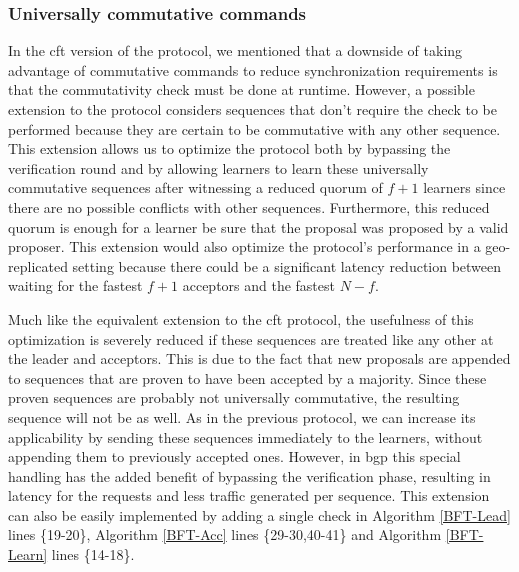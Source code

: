 \subsubsection{Universally commutative commands}
In the \acrshort{cft} version of the protocol, we mentioned that a downside of taking advantage of commutative commands to reduce synchronization requirements is that the commutativity check must be done at runtime. However, a possible extension to the protocol considers sequences that don't require the check to be performed because they are certain to be commutative with any other sequence. This extension allows us to optimize the protocol both by bypassing the verification round and by allowing learners to learn these universally commutative sequences after witnessing a reduced quorum of $f+1$ learners since there are no possible conflicts with other sequences. Furthermore, this reduced quorum is enough for a learner be sure that the proposal was proposed by a valid proposer. This extension would also optimize the protocol's performance in a geo-replicated setting because there could be a significant latency reduction between waiting for the fastest $f+1$ acceptors and the fastest $N-f$.\par
{\color{red} Much like the equivalent extension to the \acrshort{cft} protocol, the usefulness of this optimization is severely reduced if these sequences are treated like any other at the leader and acceptors. This is due to the fact that new proposals are appended to sequences that are proven to have been accepted by a majority. Since these proven sequences are probably not universally commutative, the resulting sequence will not be as well. As in the previous protocol, we can increase its applicability by sending these sequences immediately to the learners, without appending them to previously accepted ones. However, in \acrshort{bgp} this special handling has the added benefit of bypassing the verification phase, resulting in latency for the requests and less traffic generated per sequence. This extension can also be easily implemented by adding a single check in Algorithm \ref{BFT-Lead} lines \{19-20\}, Algorithm \ref{BFT-Acc} lines \{29-30,40-41\} and Algorithm \ref{BFT-Learn} lines \{14-18\}.}

